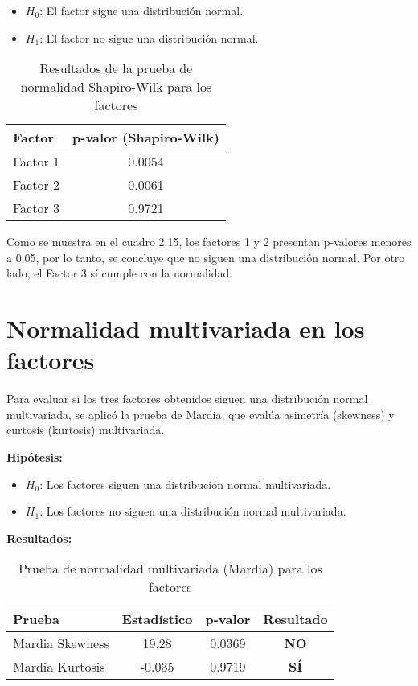 \documentclass[12pt]{report}
\begin{document}
\begin{itemize}
    \item $H_0$: El factor sigue una distribución normal.
    \item $H_1$: El factor no sigue una distribución normal.
\end{itemize}



\begin{table}[H]
\centering
\begin{tabular}{|l|c|}
\hline
\textbf{Factor} & \textbf{p-valor (Shapiro-Wilk)} \\
\hline
Factor 1 & 0.0054 \\
Factor 2 & 0.0061 \\
Factor 3 & 0.9721 \\
\hline
\end{tabular}
\caption{Resultados de la prueba de normalidad Shapiro-Wilk para los factores}
\end{table}

\noindent Como se muestra en el cuadro 2.15, los factores 1 y 2 presentan p-valores menores a 0.05, por lo tanto, se concluye que no siguen una distribución normal. Por otro lado, el Factor 3 sí cumple con la normalidad.

\newpage


\section{Normalidad multivariada en los factores}

Para evaluar si los tres factores obtenidos siguen una distribución normal multivariada, se aplicó la prueba de Mardia, que evalúa asimetría (skewness) y curtosis (kurtosis) multivariada.

\textbf{Hipótesis:}
\begin{itemize}
    \item $H_0$: Los factores siguen una distribución normal multivariada.
    \item $H_1$: Los factores no siguen una distribución normal multivariada.
\end{itemize}

\textbf{Resultados:}
\begin{table}[H]
\centering
\begin{tabular}{|l|c|c|c|}
\hline
\textbf{Prueba} & \textbf{Estadístico} & \textbf{p-valor} & \textbf{Resultado} \\
\hline
Mardia Skewness & 19.28 & 0.0369 & \textbf{NO} \\
Mardia Kurtosis & -0.035 & 0.9719 & \textbf{SÍ} \\
\hline
\end{tabular}
\caption{Prueba de normalidad multivariada (Mardia) para los factores}
\end{table}
\end{document}
